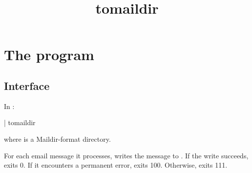 \documentclass{book}
\title{tomaildir}
\begin{document}
\section{The  program}

\subsection{Interface}
In :
\begin{code}%
  | tomaildir 
\end{code}
where  is a Maildir-format directory.

For each email message it processes,  writes the
message to .  If the write succeeds,  exits
0.  If it encounters a permanent error,  exits 100.
Otherwise,  exits 111.
\end{document}
